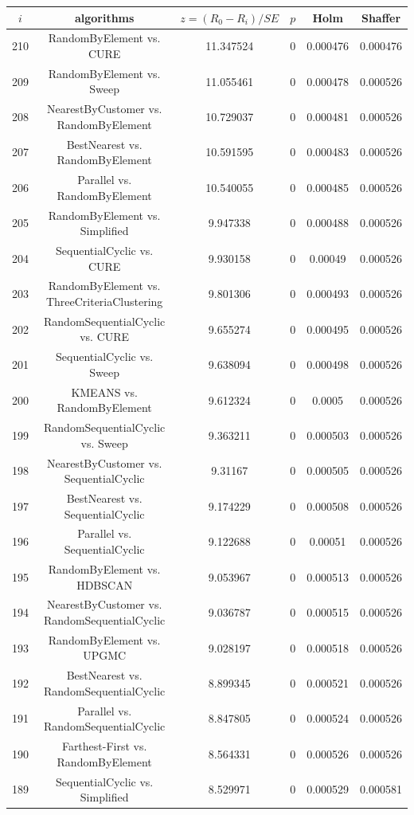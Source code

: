 \documentclass[a4paper,10pt]{article}
\begin{document}
\begin{landscape}
\begin{table}[!htp]
\centering\scriptsize
\begin{tabular}{cccccc}
$i$&algorithms&$z=(R_0 - R_i)/SE$&$p$&Holm&Shaffer\\
\hline210&RandomByElement vs. CURE&11.347524&0&0.000476&0.000476\\
209&RandomByElement vs. Sweep&11.055461&0&0.000478&0.000526\\
208&NearestByCustomer vs. RandomByElement&10.729037&0&0.000481&0.000526\\
207&BestNearest vs. RandomByElement&10.591595&0&0.000483&0.000526\\
206&Parallel vs. RandomByElement&10.540055&0&0.000485&0.000526\\
205&RandomByElement vs. Simplified&9.947338&0&0.000488&0.000526\\
204&SequentialCyclic vs. CURE&9.930158&0&0.00049&0.000526\\
203&RandomByElement vs. ThreeCriteriaClustering&9.801306&0&0.000493&0.000526\\
202&RandomSequentialCyclic vs. CURE&9.655274&0&0.000495&0.000526\\
201&SequentialCyclic vs. Sweep&9.638094&0&0.000498&0.000526\\
200&KMEANS vs. RandomByElement&9.612324&0&0.0005&0.000526\\
199&RandomSequentialCyclic vs. Sweep&9.363211&0&0.000503&0.000526\\
198&NearestByCustomer vs. SequentialCyclic&9.31167&0&0.000505&0.000526\\
197&BestNearest vs. SequentialCyclic&9.174229&0&0.000508&0.000526\\
196&Parallel vs. SequentialCyclic&9.122688&0&0.00051&0.000526\\
195&RandomByElement vs. HDBSCAN&9.053967&0&0.000513&0.000526\\
194&NearestByCustomer vs. RandomSequentialCyclic&9.036787&0&0.000515&0.000526\\
193&RandomByElement vs. UPGMC&9.028197&0&0.000518&0.000526\\
192&BestNearest vs. RandomSequentialCyclic&8.899345&0&0.000521&0.000526\\
191&Parallel vs. RandomSequentialCyclic&8.847805&0&0.000524&0.000526\\
190&Farthest-First vs. RandomByElement&8.564331&0&0.000526&0.000526\\
189&SequentialCyclic vs. Simplified&8.529971&0&0.000529&0.000581\\

\end{tabular}
\end{table}
\end{landscape}
\end{document}
